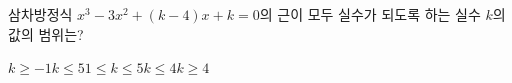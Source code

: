 삼차방정식 $x^3-3x^2+(k-4)x+k=0$의 근이 모두 실수가 되도록 하는 실수 $k$의 값의 범위는?
\begin{choices32}{$k\ge -1$}{$k\le 5$}{$1\le k\le 5$}{$k\le 4$}{$k\ge 4$}\end{choices32}
